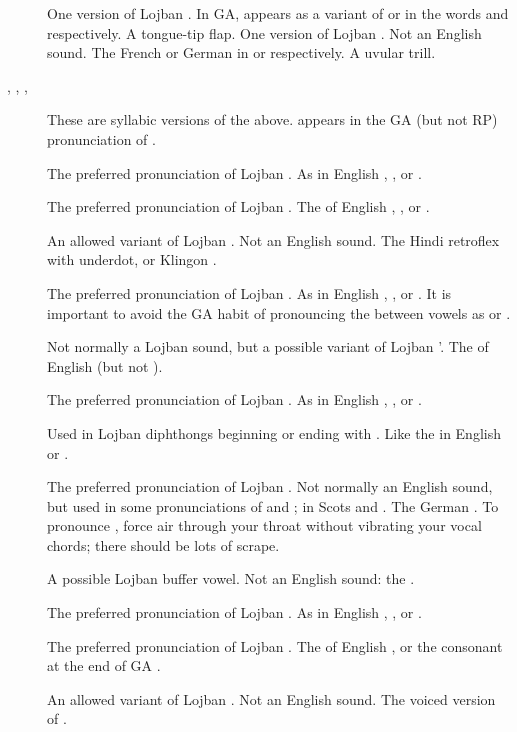 \begin{description}
\item[] One version of Lojban . In GA, appears as a variant of  or  in the words  and  respectively. A tongue-tip flap.  One version of Lojban . Not an English sound. The French or German  in  or  respectively. A uvular trill.
\item[, , , ] These are syllabic versions of the above.  appears in the GA (but not RP) pronunciation of .
\item[] The preferred pronunciation of Lojban . As in English , , or .
\item[] The preferred pronunciation of Lojban . The  of English , , or .
\item[] An allowed variant of Lojban . Not an English sound. The Hindi retroflex  with underdot, or Klingon .
\item[] The preferred pronunciation of Lojban . As in English , , or . It is important to avoid the GA habit of pronouncing the  between vowels as  or .
\item[] Not normally a Lojban sound, but a possible variant of Lojban \q{}'. The  of English  (but not ).
\item[] The preferred pronunciation of Lojban . As in English , , or .
\item[] Used in Lojban diphthongs beginning or ending with . Like the  in English   or  .
\item[] The preferred pronunciation of Lojban . Not normally an English sound, but used in some pronunciations of  and ;  in Scots  and . The German . To pronounce , force air through your throat without vibrating your vocal chords; there should be lots of scrape.
\item[] A possible Lojban buffer vowel. Not an English sound: the .
\item[] The preferred pronunciation of Lojban . As in English , , or .
\item[] The preferred pronunciation of Lojban . The  of English , or the consonant at the end of GA .
\item[] An allowed variant of Lojban . Not an English sound. The voiced version of .
\end{description}



